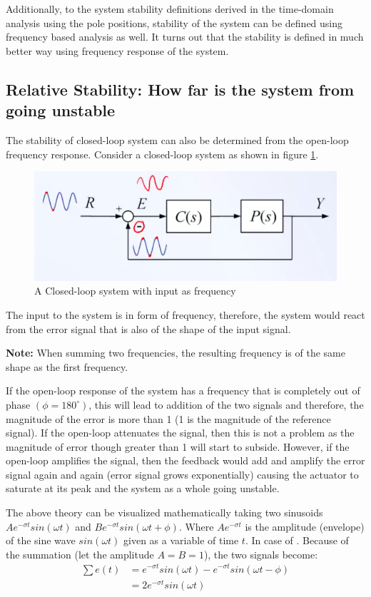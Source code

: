 Additionally, to the system stability definitions derived in the time-domain analysis using the pole positions, stability of the system can be defined using frequency based analysis as well. It turns out that the stability is defined in much better way using frequency response of the system.

\subsection{Relative Stability: How far is the system from going unstable}

The stability of closed-loop system can also be determined from the open-loop frequency response. Consider a closed-loop system as shown in figure \ref{Fig_FreqResp_RelStabil_1}.
\begin{figure}[h!]
	\centering
	\includegraphics[width=0.8\linewidth]{Bilder/FrequencyResp_ClosedLoopSystem}
	\caption{A Closed-loop system with input as frequency}
	\label{Fig_FreqResp_RelStabil_1}
\end{figure}
\newpage
The input to the system is in form of frequency, therefore, the system would react from the error signal that is also of the shape of the input signal.

\textbf{Note: }When summing two frequencies, the resulting frequency is of the same shape as the first frequency.

If the open-loop response of the system has a frequency that is completely out of phase $(\phi = 180^{\circ})$, this will lead to addition of the two signals and therefore, the magnitude of the error is more than 1 (1 is the magnitude of the reference signal). If the open-loop attenuates the signal, then this is not a problem as the magnitude of error though greater than 1 will start to subside. However, if the open-loop amplifies the signal, then the feedback would add and amplify the error signal again and again (error signal grows exponentially) causing the actuator to saturate at its peak and the system as a whole going unstable. 

The above theory can be visualized mathematically taking two sinusoids $A e^{-\sigma t} sin(\omega t)$ and $B e^{-\sigma t} sin(\omega t + \phi)$. Where $A e^{-\sigma t}$ is the amplitude (envelope) of the sine wave $sin(\omega t)$ given as a variable of time $t$. In case of . Because of the summation (let the amplitude $A =B = 1$), the two signals become:
\begin{align}
	\sum e(t) 	&= e^{-\sigma t} sin(\omega t) - e^{-\sigma t} sin(\omega t - \phi) \\
				&= 2 e^{-\sigma t} sin(\omega t) \label{Eq_ConstructiveInterference}
\end{align}

